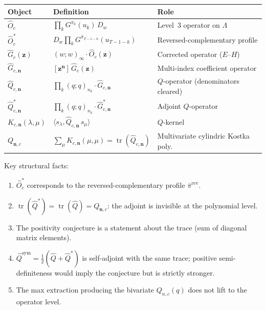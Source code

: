\documentclass[11pt]{article}
\newcommand{\La}{\Lambda}
\DeclareMathOperator{\tr}{tr}
\theoremstyle{plain}
\theoremstyle{definition}
\begin{document}
\begin{center}
\begin{tabular}{l|l|l}
\textbf{Object} & \textbf{Definition} & \textbf{Role} \\ \hline
$\hat{O}_c$ &
  $\prod_k G^{\pi_k}(u_k)\, D_w$ &
  Level~3 operator on $\La$ \\[4pt]
$\hat{O}_c^*$ &
  $D_w \prod_k G^{\bar\pi_{T-1-k}}(u_{T-1-k})$ &
  Reversed-complementary profile \\[4pt]
$\hat{G}_c(\mathbf{z})$ &
  $(w;w)_\infty \cdot \hat{O}_c(\mathbf{z})$ &
  Corrected operator ($E$--$H$) \\[4pt]
$\hat{G}_{c,\mathbf{n}}$ &
  $[\mathbf{z}^\mathbf{n}]\,\hat{G}_c(\mathbf{z})$ &
  Multi-index coefficient operator \\[4pt]
$\hat{Q}_{c,\mathbf{n}}$ &
  $\prod_k (q;q)_{n_k} \cdot \hat{G}_{c,\mathbf{n}}$ &
  $Q$-operator (denominators cleared) \\[4pt]
$\hat{Q}_{c,\mathbf{n}}^*$ &
  $\prod_k (q;q)_{n_k} \cdot \hat{G}_{c,\mathbf{n}}^*$ &
  Adjoint $Q$-operator \\[4pt]
$K_{c,\mathbf{n}}(\lambda,\mu)$ &
  $\langle s_\lambda, \hat{Q}_{c,\mathbf{n}}\, s_\mu \rangle$ &
  $Q$-kernel \\[4pt]
$Q_{\mathbf{n},c}$ &
  $\sum_\mu K_{c,\mathbf{n}}(\mu,\mu) = \tr(\hat{Q}_{c,\mathbf{n}})$ &
  Multivariate cylindric Kostka poly.
\end{tabular}
\end{center}

\medskip
Key structural facts:
\begin{enumerate}
  \item $\hat{O}_c^*$ corresponds to the reversed-complementary
    profile $\bar\pi^{\mathrm{rev}}$.
  \item $\tr(\hat{Q}^*) = \tr(\hat{Q}) = Q_{\mathbf{n},c}$: the
    adjoint is invisible at the polynomial level.
  \item The positivity conjecture is a statement about the trace
    (sum of diagonal matrix elements).
  \item $\hat{Q}^{\mathrm{sym}}
    = \frac{1}{2}(\hat{Q} + \hat{Q}^*)$ is self-adjoint with the
    same trace; positive semi-definiteness would imply the
    conjecture but is strictly stronger.
  \item The max extraction producing the bivariate $Q_{n,c}(q)$
    does not lift to the operator level.
\end{enumerate}


\end{document}

